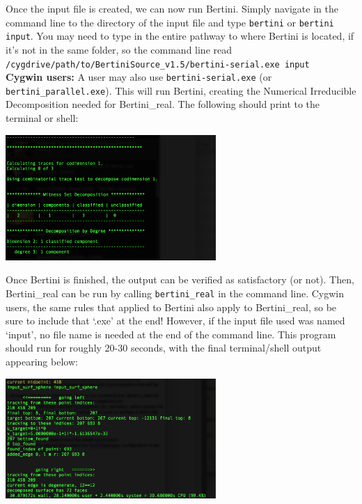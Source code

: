 Once the input file is created, we can now run Bertini. Simply navigate in the command line to the directory of the input file and type \texttt{bertini} or \texttt{bertini input}.  You may need to type in the entire pathway to where Bertini is located, if it's not in the same folder, so the command line read \newline \texttt{/cygdrive/path/to/BertiniSource\_v1.5/bertini-serial.exe input}\- \\ \textbf{Cygwin users:} A user may also use \texttt{bertini-serial.exe} (or \texttt{bertini\_parallel.exe}). This will run Bertini, creating the Numerical Irreducible Decomposition needed for Bertini\_real. The following should print to the terminal or shell:

\begin{center}\begin{minipage}{0.9\linewidth}
\centering
\includegraphics[width=0.6\textwidth]{CayleyCubicBertiniRun.png}
\end{minipage}\end{center}

Once Bertini is finished, the output can be verified as satisfactory (or not). Then, Bertini\_real can be run by calling \texttt{bertini\_real} in the command line. Cygwin users, the same rules that applied to Bertini also apply to Bertini\_real, so be sure to include that `.exe' at the end! However, if the input file used was named `input', no file name is needed at the end of the command line. This program should run for roughly 20-30 seconds, with the final terminal/shell output appearing below:

\begin{center}\begin{minipage}{0.9\linewidth}
\centering
\includegraphics[width=0.6\textwidth]{CayleyCubicBertiniRealRun}
\end{minipage}\end{center}

